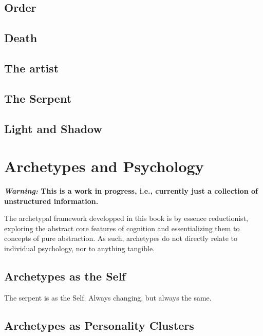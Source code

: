 \documentclass[
]{book}
\begin{document}
\hypertarget{order}{%
\section{Order}\label{order}}

\hypertarget{death}{%
\section{Death}\label{death}}

\hypertarget{the-artist}{%
\section{The artist}\label{the-artist}}

\hypertarget{the-serpent}{%
\section{The Serpent}\label{the-serpent}}

\hypertarget{light-and-shadow}{%
\section{Light and Shadow}\label{light-and-shadow}}

\hypertarget{archetypes-and-psychology}{%
\chapter{Archetypes and Psychology}\label{archetypes-and-psychology}}

\textbf{\emph{Warning:} This is a work in progress, i.e., currently just a collection of unstructured information.}

The archetypal framework developped in this book is by essence reductionist, exploring the abstract core features of cognition and essentializing them to concepts of pure abstraction. As such, archetypes do not directly relate to individual psychology, nor to anything tangible.

\hypertarget{archetypes-as-the-self}{%
\section{Archetypes as the Self}\label{archetypes-as-the-self}}

The serpent is as the Self. Always changing, but always the same.

\hypertarget{archetypes-as-personality-clusters}{%
\section{Archetypes as Personality Clusters}\label{archetypes-as-personality-clusters}}
\end{document}
